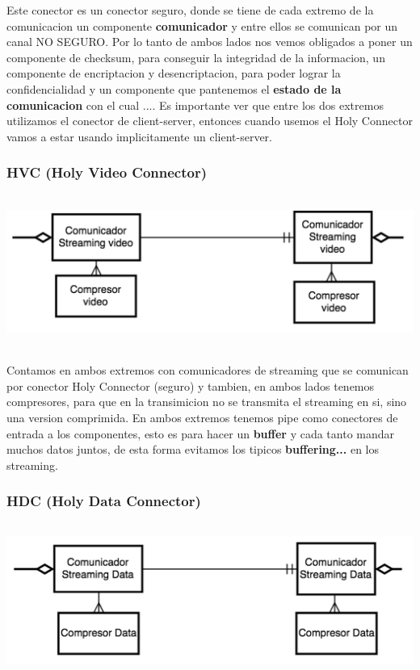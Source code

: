 Este conector es un conector seguro, donde se tiene de cada extremo de la comunicacion un componente \textbf{comunicador} y entre ellos se comunican por un canal NO SEGURO. 
Por lo tanto de ambos lados nos vemos obligados a poner un componente de checksum, para conseguir la integridad de la informacion, un componente de encriptacion y desencriptacion, para poder lograr la confidencialidad y un componente que pantenemos el \textbf{estado de la comunicacion} con el cual ....
Es importante ver que entre los dos extremos utilizamos el conector de client-server, entonces cuando usemos el Holy Connector vamos a estar usando implicitamente un client-server.


\subsubsection{HVC (Holy Video Connector)}

\includegraphics[height=5cm]{diagramas/HVC} 


Contamos en ambos extremos con comunicadores de streaming que se comunican por conector Holy Connector (seguro) y tambien, en ambos lados tenemos compresores, para que en la transimicion no se transmita el streaming en si, sino una version comprimida.
En ambos extremos tenemos pipe como conectores de entrada a los componentes, esto es para hacer un \textbf{buffer} y cada tanto mandar muchos datos juntos, de esta forma evitamos los tipicos \textbf{buffering...} en los streaming.


\subsubsection{HDC (Holy Data Connector)}

\includegraphics[height=5cm]{diagramas/HDC} 

